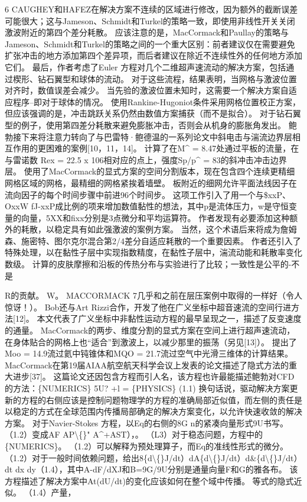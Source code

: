 \documentclass[UTF8,11pt,a4paper,openany,fontset=fandol]{ctexbook}
\begin{document}
6 CAUGHEY和HAFEZ在解决方案不连续的区域进行修改，因为额外的截断误差可能很大；这与Jameson、Schmidt和Turkel的策略一致，即使用非线性开关关闭激波附近的第四个差分耗散。 应该注意的是，MacCormack和Paullay的策略与Jameson、Schmidt和Turkel的策略之间的一个重大区别：前者建议仅在需要避免扩张冲击的地方添加第四个差异项，而后者建议在除近不连续性外的任何地方添加它们。 最后，作者考虑了Euler 方程对几个二维超声速流动的解决方案，包括通过楔形、钻石翼型和球体的流动。 对于这些流程，结果表明，当网格与激波位置对齐时，数值误差会减少。 当先验的激波位置未知时，这需要一个解决方案自适应程序--即对于球体的情况。 使用Rankine-Hugoniot条件采用网格位置校正方案，但应该强调的是，冲击跳跃关系仍然由数值方案捕获（而不是拟合）。 对于钻石翼型的例子，使用第四差分耗散来避免膨胀冲击，否则会从机身的膨胀角发出。 鲍勃接下来将注意力转向了与巴雷特·鲍德温的一系列论文中斜电击与湍流边界层相互作用的更困难的案例[10，11，14]。 计算了在M\textasciicircum{} = 8.47处通过平板的流量，在与雷诺数 Rex = 22.5 x 106相对应的点上，强度Sp/p\textasciicircum{} = 83的斜冲击冲击边界层。 使用了MacCormack的显式方案的空间分割版本，现在包含四个连续更精细网格区域的网格，最精细的网格紧挨着墙壁。 板附近的细网允许平面法线因子在流向因子的每个时间步骤中前进96个时间步。 这项工作引入了用一个与\$xxP、OxxW fJ-xxP成比例的项来增加数值黏性的想法，其中p是流体压力，w是守恒变量的向量，5XX和fixx分别是3点微分和平均运算符。 作者发现有必要添加这种额外的耗散，以稳定具有如此强激波的案例方案。 当然，这个术语后来将成为詹姆森、施密特、图尔克尔混合第2/4差分自适应耗散的一个重要因素。 作者还引入了特殊处理，以在黏性子层中实现指数精度，在黏性子层中，湍流动能和耗散率变化数级。 计算的皮肤摩擦和沿板的传热分布与实验进行了比较；一致性是公平的-不是

R的贡献。 W。 MACCORMACK 7几乎和之前在层压案例中取得的一样好（令人惊讶！）。 Bob还与Art Rizzi合作，开发了他在广义坐标中超音速流的空间行进方法[12]。 本文代表了广义坐标中非黏性运动方程的最早呈现之一，描述了反变速度的通量。 MacCormack的两步、维度分割的显式方案在空间上进行超声速流动，在身体贴合的网格上也“适合”到激波上，以减少那里的振荡（另见[13]）。 提出了Moo = 14.9流过氦中钝锥体和MQO = 21.7流过空气中光滑三维体的计算结果。 MacCormack在第19届AIAA航空航天科学会议上发表的论文描述了隐式方法的重大进步[37]。 这篇论文还因包含方程而引人名，该方程也许最能描述鲍勃对CFD的方法：\{NUMERICS\} 5U? +l = \{PHYSICS\} (1.1) 换句话说，驱动解决方案更新的方程的右侧应该是控制问题物理学的方程的准确局部近似值，而左侧的责任是以稳定的方式在全球范围内传播局部确定的解决方案变化，以允许快速收敛的解决方案。 对于Navier-Stokes 方程，以Eq的右侧的8G n的紧凑向量形式9U书写。 （1.2）变成AF AP\textbackslash\{\}" A\textasciicircum{}+AST），。 （L3）对于稳态问题，方程中的\{NUMERICS\}。 （1.2）可以解释为预处理算子，而Eq的准线性形式的微分。 （1.2）对于一般时间依赖问题，给出8\{d\textbackslash\{\}J/dt）dA\{d\textbackslash\{\}J/dt）d\&\{d\textbackslash\{\}J/dt）dt dx dy（1.4），其中A-dF/dXJ和B=9G/9U分别是通量向量F和G的雅各布。 该方程描述了解决方案中At(dU/dt)的变化应该如何在整个域中传播。 等式的隐式近似。 （1.4）产量，
\end{document}
